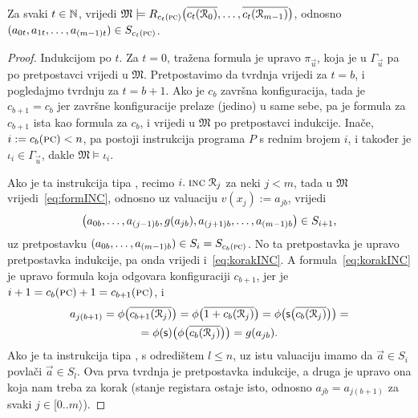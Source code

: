 \begin{lema}[{name=[izračunavanje čuva istinitost formulskih reprezentacija konfiguracija]}]\label{lm:formcomputesteps}
Za svaki $t\in{\mathbb N}$, vrijedi $\mathfrak M\models R_{c_t(\textsc{pc})}\bigl(\overline{c_t(\mathcal R_{0})},\dotsc,\overline{c_t(\mathcal R_{m-1})}\bigr)$, odnosno $(a_{0t},a_{1t},\dotsc,a_{(m-1)t})\in S_{c_t(\textsc{pc})}$.
\end{lema}
\begin{proof}
Indukcijom po $t$. Za $t=0$, tražena formula je upravo $\pi_{\vec u}$, koja je u $\Gamma_{\vec u}$ pa po pretpostavci vrijedi u $\mathfrak M$. Pretpostavimo da tvrdnja vrijedi za $t=b$, i pogledajmo tvrdnju za $t=b+1$. Ako je $c_b$ završna konfiguracija, tada je $c_{b+1}=c_b$ jer završne konfiguracije prelaze (jedino) u same sebe, pa je formula za $c_{b+1}$ ista kao formula za $c_b$, i vrijedi u $\mathfrak M$ po pretpostavci indukcije. Inače, $i:=c_b(\textsc{pc})<n$, pa postoji instrukcija programa $P$ s rednim brojem $i$, i također je $\iota_i\in\Gamma_{\vec u}$, dakle $\mathfrak M\models\iota_i$.

Ako je ta instrukcija tipa \inc, recimo $i.\;\textsc{inc}\;\mathcal R_{j}$ za neki $j<m$, tada u $\mathfrak M$ vrijedi~\eqref{eq:formINC}, odnosno uz valuaciju $v(x_j):=a_{jb}$, vrijedi
\begin{equation}
\label{eq:korakINC}
    \bigl(a_{0b},\dotsc,a_{(j-1)b},g(a_{jb}),a_{(j+1)b},\dotsc,a_{(m-1)b}\bigr)\in S_{i+1}\text,
\end{equation} uz pretpostavku $(a_{0b},\dotsc,a_{(m-1)b})\in S_i=S_{c_b(\textsc{pc})}$. No ta pretpostavka je upravo pretpostavka indukcije, pa onda vrijedi i~\eqref{eq:korakINC}. A formula~\eqref{eq:korakINC} je upravo formula koja odgovara konfiguraciji $c_{b+1}$, jer je $i+1=c_b(\textsc{pc})+1=c_{b+1}(\textsc{pc})$, i
\begin{multline}
a_{j(b+1)}=\phi\bigl(\overline{c_{b+1}(\mathcal R_{j})}\bigr)=\phi\bigl(\overline{1+c_b(\mathcal R_{j})}\bigr)=\phi\bigl(\mathsf s\bigl(\overline{c_b(\mathcal R_{j})}\bigr)\bigr)=\\
=\phi(\mathsf s)\bigl(\phi\bigl(\overline{c_b(\mathcal R_{j})}\bigr)\bigr)=g(a_{jb})\text.
\end{multline}
Ako je ta instrukcija tipa \goto, s odredištem $l\le n$, uz istu valuaciju imamo da $\vec a\in S_i$ povlači $\vec a\in S_l$. Ova prva tvrdnja je pretpostavka indukcije, a druga je upravo ona koja nam treba za korak (stanje registara ostaje isto, odnosno $a_{jb}=a_{j(b+1)}$ za svaki $j\in[0..m\rangle$).


\end{proof}
